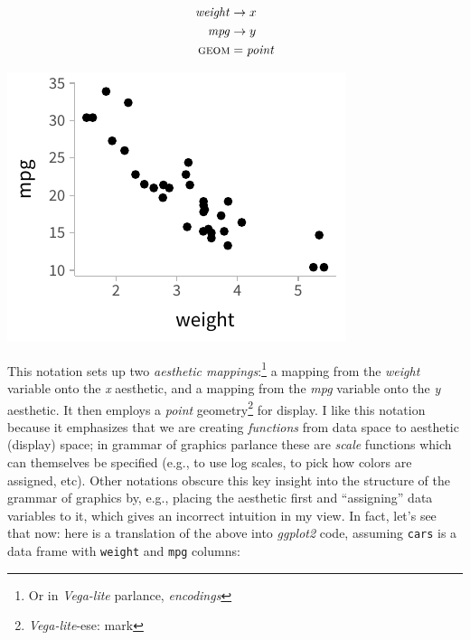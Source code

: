 \documentclass[journal]{vgtc}                     %
\begin{document}
\hfill\break
\noindent
  \begin{minipage}{.5\columnwidth}
    \begin{align*}
\mathit{weight} &\rightarrow x\\
\mathit{mpg} &\rightarrow y\\
\textsc{geom} &= \mathit{point}
\end{align*}
  \end{minipage}%
  \begin{minipage}{.4\columnwidth}
    \centering
    \includegraphics[width=1.2\columnwidth]{figs/2-mpg_v_weight.pdf}
  \end{minipage}


This notation sets up two \textit{aesthetic mappings}:\footnote{Or in \textit{Vega-lite} parlance, \textit{encodings}} a mapping from the \textit{weight} variable onto the \textit{x} aesthetic, and a mapping from the \textit{mpg} variable onto the \textit{y} aesthetic. It then employs a \textit{point} geometry\footnote{\textit{Vega-lite}-ese: mark} for display. I like this notation because it emphasizes that we are creating \textit{functions} from data space to aesthetic (display) space; in grammar of graphics parlance these are \textit{scale} functions which can themselves be specified (e.g., to use log scales, to pick how colors are assigned, etc). Other notations obscure this key insight into the structure of the grammar of graphics by, e.g., placing the aesthetic first and ``assigning'' data variables to it, which gives an incorrect intuition in my view. In fact, let's see that now: here is a translation of the above into \textit{ggplot2} code, assuming \texttt{cars} is a data frame with \texttt{weight} and \texttt{mpg} columns:
\end{document}
